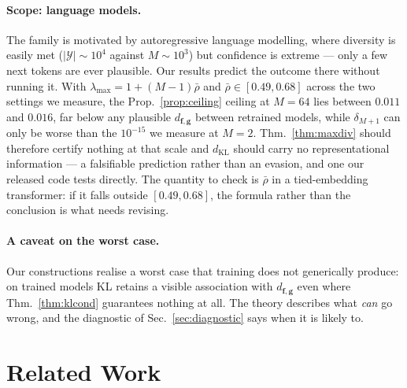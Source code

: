 \documentclass[10pt,letterpaper,twocolumn]{article}
\newcommand{\Y}{\mathcal{Y}}
\newcommand{\bff}{\mathbf{f}}
\newcommand{\bfg}{\mathbf{g}}
\newcommand{\dKL}{d_{\mathrm{KL}}}
\newcommand{\dfg}{d_{\bff,\bfg}}
\theoremstyle{plain}
\theoremstyle{definition}
\theoremstyle{remark}
\begin{document}
\paragraph{Scope: language models.}
The family is motivated by autoregressive language modelling, where diversity
is easily met ($|\Y|\sim10^{4}$ against $M\sim10^{3}$) but confidence is
extreme --- only a few next tokens are ever plausible. Our results predict the
outcome there without running it. With
$\lambda_{\max}=1+(M-1)\bar\rho$ and $\bar\rho\in[0.49,0.68]$ across the two
settings we measure, the Prop.~\ref{prop:ceiling} ceiling at $M=64$ lies
between $0.011$ and $0.016$, far below any plausible $\dfg$ between retrained
models, while $\delta_{M+1}$ can only be worse than the $10^{-15}$ we measure
at $M=2$. Thm.~\ref{thm:maxdiv} should therefore certify nothing at that scale
and $\dKL$ should carry no representational information --- a falsifiable
prediction rather than an evasion, and one our released code tests directly.
The quantity to check is $\bar\rho$ in a tied-embedding transformer: if it
falls outside $[0.49,0.68]$, the formula rather than the conclusion is what
needs revising.

\paragraph{A caveat on the worst case.}
Our constructions realise a worst case that training does not generically
produce: on trained models KL retains a visible association with $\dfg$ even
where Thm.~\ref{thm:klcond} guarantees nothing at all. The theory describes
what \emph{can} go wrong, and the diagnostic of Sec.~\ref{sec:diagnostic} says
when it is likely to.

\section{Related Work}
\label{sec:related}
\end{document}
